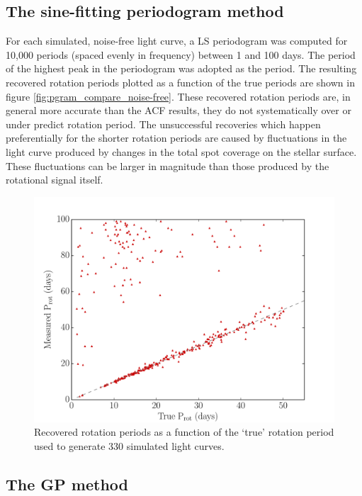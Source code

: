 \subsection{The sine-fitting periodogram method}

For each simulated, noise-free light curve, a LS periodogram was computed for
10,000 periods (spaced evenly in frequency) between 1 and 100 days.
The period of the highest peak in the periodogram was adopted as the period.
The resulting recovered rotation periods plotted as a function of the true
periods are shown in figure \ref{fig:pgram_compare_noise-free}.
These recovered rotation periods are, in general more accurate than the ACF
results, they do not systematically over or under predict rotation period.
The unsuccessful recoveries which happen preferentially for the shorter
rotation periods are caused by fluctuations in the light curve produced by
changes in the total spot coverage on the stellar surface.
These fluctuations can be larger in magnitude than those produced by the
rotational signal itself.

\begin{figure}
\begin{center}
\includegraphics[width=6in, clip=true]{figures/pgram_compare_noise-free.pdf}
\caption{Recovered rotation periods as a function of the `true' rotation
period used to generate 330 simulated light curves.}
\end{center}
\end{figure}
\label{fig:compare_noise_free}

\subsection{The GP method}


